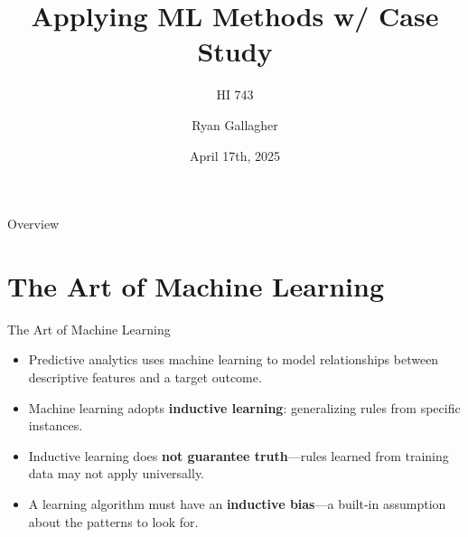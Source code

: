 \documentclass[aspectratio=169,xcolor=dvipsnames]{beamer}
\title{Applying ML Methods w/ Case Study}
\subtitle{HI 743}
\author{Ryan Gallagher}
\institute
{
    Department of Health Informatics and Administration \\
    Zilber College of Public Health \\
    University of Wisconsin - Milwaukee%
}
\date{April 17th, 2025} %
\begin{document}
\begin{frame}
    \titlepage
\end{frame}


\begin{frame}{Overview}
    \tableofcontents
\end{frame}


\section{The Art of Machine Learning}
\begin{frame}{The Art of Machine Learning}


\begin{itemize}
  \item Predictive analytics uses machine learning to model relationships between descriptive features and a target outcome.
  \item Machine learning adopts \textbf{inductive learning}: generalizing rules from specific instances.
  \item Inductive learning does \textbf{not guarantee truth}—rules learned from training data may not apply universally.
  \item A learning algorithm must have an \textbf{inductive bias}—a built-in assumption about the patterns to look for.
\end{itemize}
\end{frame}
\end{document}

